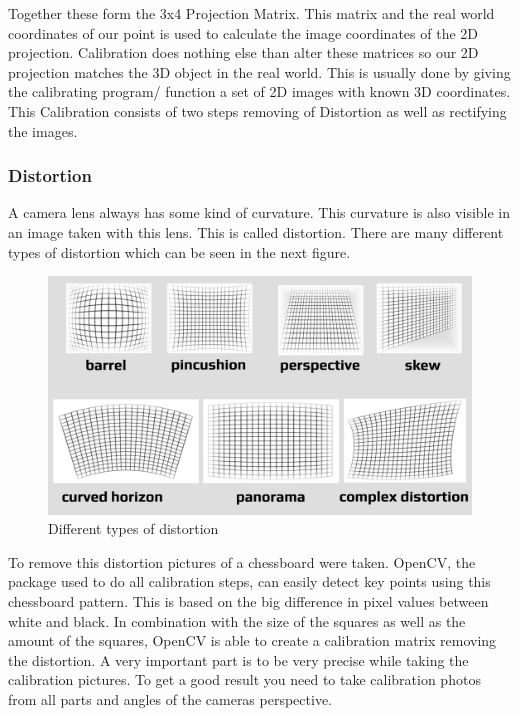 \documentclass[journal,onecolumn]{IEEEtran}
\begin{document}
\noindent
Together these form the 3x4 Projection Matrix. This matrix and the real world coordinates of our point is used to calculate the image coordinates of the 2D projection. Calibration does nothing else than alter these matrices so our 2D projection matches the 3D object in the real world. This is usually done by giving the calibrating program/ function a set of 2D images with known 3D coordinates. 
This Calibration consists of two steps removing of Distortion as well as rectifying the images\cite{ImageRectification}. \newline
\subsubsection{Distortion}
\noindent
A camera lens always has some kind of curvature. This curvature is also visible in an image taken with this lens. This is called distortion. There are many different types of distortion which can be seen in the next figure.
\begin{figure}[H]
	\centering
	\includegraphics[scale=0.3]{distortion.jpg}
	\captionsetup{justification=centering}
	\caption{Different types of distortion}
\end{figure}
\noindent
To remove this distortion pictures of a chessboard were taken. OpenCV, the package used to do all calibration steps, can easily detect key points using this chessboard pattern. This is based on the big difference in pixel values between white and black. In combination with the size of the squares as well as the amount of the squares, OpenCV is able to create a calibration matrix removing the distortion.\newline
A very important part is to be very precise while taking the calibration pictures. To get a good result you need to take calibration photos from all parts and angles of the cameras perspective.\newline
\end{document}
